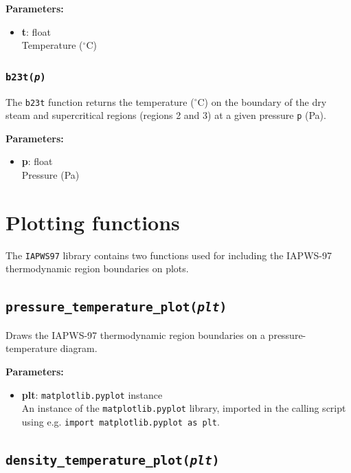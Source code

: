 \textbf{Parameters:}
\begin{itemize}
\item \textbf{t}: float\\
  Temperature ($^{\circ}$C)
\end{itemize}

\begin{snugshade}
\subsubsection{\texttt{b23t(\emph{p})}}
\end{snugshade}
\label{sec:iapws97:b23t}

The \texttt{b23t} function returns the temperature ($^{\circ}$C) on the boundary of the dry steam and supercritical regions (regions 2 and 3) at a given pressure \texttt{p} (Pa).

\textbf{Parameters:}
\begin{itemize}
\item \textbf{p}: float\\
  Pressure (Pa)
\end{itemize}

\section{Plotting functions}

The \texttt{IAPWS97} library contains two functions used for including the IAPWS-97 thermodynamic region boundaries on plots.

\begin{snugshade}
\subsection{\texttt{pressure\_temperature\_plot(\emph{plt})}}
\end{snugshade}
\label{sec:iapws97:pressure_temperature_plot}

Draws the IAPWS-97 thermodynamic region boundaries on a pressure-temperature diagram.

\textbf{Parameters:}
\begin{itemize}
\item \textbf{plt}: \texttt{matplotlib.pyplot} instance\\
  An instance of the \texttt{matplotlib.pyplot} library, imported in the calling script using e.g. \texttt{import matplotlib.pyplot as plt}.
\end{itemize}

\begin{snugshade}
\subsection{\texttt{density\_temperature\_plot(\emph{plt})}}
\end{snugshade}
\label{sec:iapws97:density_temperature_plot}

